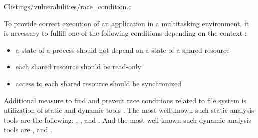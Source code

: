{}
	{C}{listings/vulnerabilities/race_condition.c}

%
To provide correct execution of an application in a multitasking environment, it is necessary to fulfill one of the following conditions depending on the context  : 
\begin{itemize}
	\item a state of a process should not depend on a state of a shared resource
	\item each shared resource should be read-only
	\item access to each shared resource should be synchronized
\end{itemize}

%
Additional measure to find and prevent race conditions related to file system is utilization of static and dynamic tools . 
%
The most well-known such static analysis tools are the following:  ,  , and  .
%
And the most well-known such dynamic analysis tools are  , and  . 